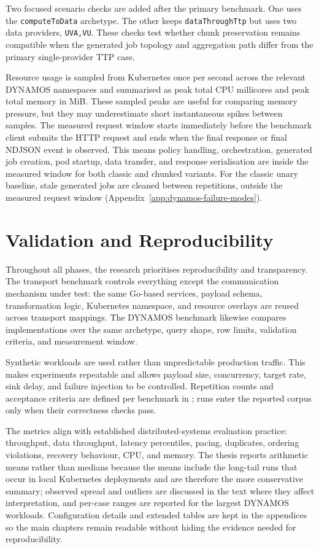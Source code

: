 Two focused scenario checks are added after the primary benchmark. One uses the \texttt{computeToData} archetype. The other keeps \texttt{dataThroughTtp} but uses two data providers, \texttt{UVA,VU}. These checks test whether chunk preservation remains compatible when the generated job topology and aggregation path differ from the primary single-provider TTP case.

Resource usage is sampled from Kubernetes once per second across the relevant DYNAMOS namespaces and summarised as peak total CPU millicores and peak total memory in MiB. These sampled peaks are useful for comparing memory pressure, but they may underestimate short instantaneous spikes between samples. The measured request window starts immediately before the benchmark client submits the HTTP request and ends when the final response or final NDJSON event is observed. This means policy handling, orchestration, generated job creation, pod startup, data transfer, and response serialisation are inside the measured window for both classic and chunked variants. For the classic unary baseline, stale generated jobs are cleaned between repetitions, outside the measured request window (Appendix~\ref{app:dynamos-failure-modes}).

\section{Validation and Reproducibility}\label{sec:validation-reproducibility}

Throughout all phases, the research prioritises reproducibility and transparency. The transport benchmark controls everything except the communication mechanism under test: the same Go-based services, payload schema, transformation logic, Kubernetes namespace, and resource overlays are reused across transport mappings. The DYNAMOS benchmark likewise compares implementations over the same archetype, query shape, row limits, validation criteria, and measurement window.

Synthetic workloads are used rather than unpredictable production traffic. This makes experiments repeatable and allows payload size, concurrency, target rate, sink delay, and failure injection to be controlled. Repetition counts and acceptance criteria are defined per benchmark in ; runs enter the reported corpus only when their correctness checks pass.

The metrics align with established distributed-systems evaluation practice: throughput, data throughput, latency percentiles, pacing, duplicates, ordering violations, recovery behaviour, CPU, and memory. The thesis reports arithmetic means rather than medians because the means include the long-tail runs that occur in local Kubernetes deployments and are therefore the more conservative summary; observed spread and outliers are discussed in the text where they affect interpretation, and per-case ranges are reported for the largest DYNAMOS workloads. Configuration details and extended tables are kept in the appendices so the main chapters remain readable without hiding the evidence needed for reproducibility.

